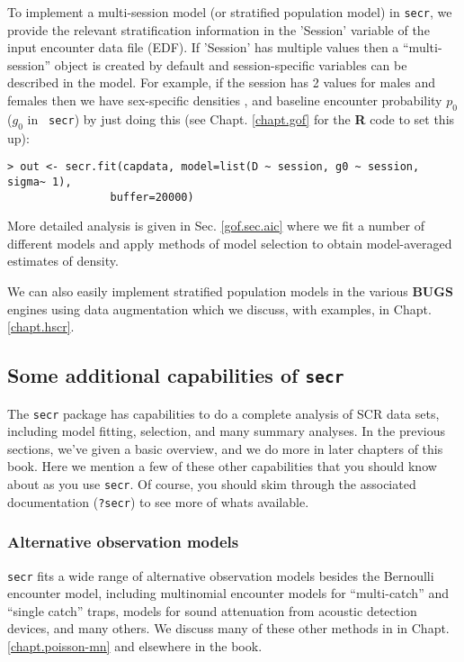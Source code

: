 To implement a multi-session model (or stratified population model) in
\mbox{\tt secr},
we provide the relevant stratification information in the 
 'Session' variable of the input encounter data file (EDF). If
 'Session' has multiple values then a
``multi-session'' object is created by default and session-specific variables can
be described in the model. For example, if the session has 2 values
for males and females then we have sex-specific densities , and
baseline encounter probability $p_{0}$ ($g_{0}$  in \mbox{\tt
  secr}) by just doing this (see Chapt. \ref{chapt.gof} for the {\bf
  R} code to set this up):
\begin{verbatim}
> out <- secr.fit(capdata, model=list(D ~ session, g0 ~ session, sigma~ 1),
                buffer=20000)
\end{verbatim}
More detailed analysis is given in Sec. \ref{gof.sec.aic} where we fit
a number of different models and apply methods of model selection to
obtain model-averaged estimates of density.

We can also easily implement stratified population models in the
various {\bf BUGS} engines using data augmentation
\citep{converse_royle:2012,royle_converse:2013} which we discuss, with
examples,  in Chapt. \ref{chapt.hscr}.


\subsection{Some additional capabilities of \mbox{\tt secr}}

The \mbox{\tt secr} package has capabilities to do a complete analysis
of SCR data sets, including model fitting, selection, and many summary
analyses. In the previous sections, we've given a basic overview, and
we do more in later chapters of this book.  Here we mention a few of
these other capabilities that you should know about as you use
\mbox{\tt secr}. Of course, you should skim through the
associated documentation (\mbox{\tt ?secr}) to see more of whats available.

\subsubsection{Alternative observation models}
\mbox{\tt secr} fits a wide range of alternative observation models
besides the Bernoulli encounter model, including multinomial encounter
models for ``multi-catch'' and ``single catch'' traps, models for
sound attenuation from acoustic detection devices, and many others. We
discuss many of these other methods in in
Chapt. \ref{chapt.poisson-mn} and elsewhere in the book.

